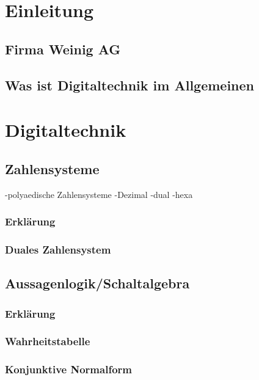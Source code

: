 

	\frontmatter
	
	
	\tableofcontents
	\listoffigures
	\listoftables
	\mainmatter
	\chapter{Einleitung}\label{kap: einleitung}
	\section{Firma Weinig AG}\label{kap: weinig}
	\section{Was ist Digitaltechnik im Allgemeinen}\label{kap: digitaltechnikAlg}
	\chapter{Digitaltechnik}\label{kap: digitaltechnik}
	\section{Zahlensysteme}\label{kap: zahlensysteme}
	-polyaedische Zahlensysteme
		-Dezimal
		-dual
		-hexa
	\subsection{Erklärung}\label{kap: erklärung}
	\subsection{Duales Zahlensystem}\label{kap: duales Zahlensystem}
	\section{Aussagenlogik/Schaltalgebra}\label{kap: aussagenlogik}
	\subsection{Erklärung}\label{kap: erklräungAussage}
	\subsection{Wahrheitstabelle}\label{kap: wahrheitstabelle}
	\subsection{Konjunktive Normalform}\label{kap: knf}
